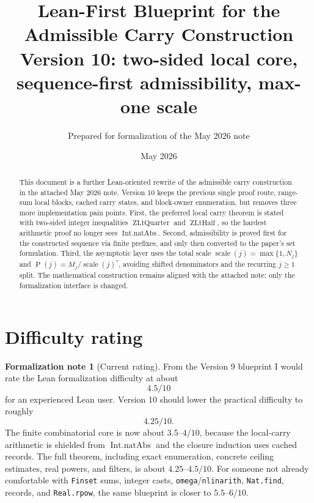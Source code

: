 \documentclass[11pt]{article}
\title{Lean-First Blueprint for the Admissible Carry Construction\\
Version 10: two-sided local core, sequence-first admissibility, max-one scale}
\author{Prepared for formalization of the May 2026 note}
\date{May 2026}
\theoremstyle{definition}
\newtheorem{formalnote}[definition]{Formalization note}
\theoremstyle{plain}
\theoremstyle{remark}
\newcommand{\Pfun}{\operatorname{P}}
\newcommand{\Scale}{\operatorname{scale}}
\newcommand{\ZLtQuarter}{\operatorname{ZLtQuarter}}
\newcommand{\ZLtHalf}{\operatorname{ZLtHalf}}
\begin{document}
\maketitle

\begin{abstract}
This document is a further Lean-oriented rewrite of the admissible carry construction in the attached May 2026 note.  Version 10 keeps the previous single proof route, range-sum local blocks, cached carry states, and block-owner enumeration, but removes three more implementation pain points.  First, the preferred local carry theorem is stated with two-sided integer inequalities \(\ZLtQuarter\) and \(\ZLtHalf\), so the hardest arithmetic proof no longer sees \(\operatorname{Int.natAbs}\).  Second, admissibility is proved first for the constructed sequence via finite prefixes, and only then converted to the paper's set formulation.  Third, the asymptotic layer uses the total scale \(\Scale(j)=\max\{1,N_j\}\) and \(\Pfun(j)=M_j/\Scale(j)^\tau\), avoiding shifted denominators and the recurring \(j\ge1\) split.  The mathematical construction remains aligned with the attached note; only the formalization interface is changed.
\end{abstract}

\tableofcontents

\section{Difficulty rating}

\begin{formalnote}[Current rating]
From the Version 9 blueprint I would rate the Lean formalization difficulty at about
\[
        \boxed{4.5/10}
\]
for an experienced Lean user.  Version 10 should lower the practical difficulty to roughly
\[
        \boxed{4.25/10}.
\]
The finite combinatorial core is now about \(3.5\)--\(4/10\), because the local-carry arithmetic is shielded from \(\operatorname{Int.natAbs}\) and the closure induction uses cached records.  The full theorem, including exact enumeration, concrete ceiling estimates, real powers, and filters, is about \(4.25\)--\(4.5/10\).  For someone not already comfortable with \verb|Finset| sums, integer casts, \verb|omega|/\verb|nlinarith|, \verb|Nat.find|, records, and \verb|Real.rpow|, the same blueprint is closer to \(5.5\)--\(6/10\).
\end{formalnote}
\end{document}
